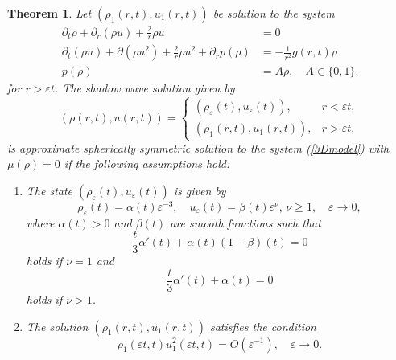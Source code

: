 \documentclass[reqno]{article}%
\theoremstyle{plain}
\newtheorem{theorem}{Theorem}[section]
\theoremstyle{definition}
\theoremstyle{remark}
\numberwithin{equation}{section}
\begin{document}
\begin{theorem}\label{thm:sdw0}
Let $(\rho_1(r,t),u_1(r,t))$ be  solution to the system
\begin{equation*}
\begin{split}
\partial_t \rho+\partial_r(\rho u)+\frac{2}{r}\rho u &=0\\
\partial_t(\rho u)+\partial(\rho u^2)+\frac{2}{r}\rho u^2+\partial_r p(\rho) &=-\frac{1}{r^2}g(r,t)\rho\\
p(\rho)&=A\rho,\quad A\in\{0,1\}.
\end{split}
\end{equation*}
for $r>\varepsilon t$. 
 The shadow wave solution given by 
\begin{equation*}
(\rho(r,t),u(r,t))=
\begin{cases}
(\rho_\varepsilon(t), u_\varepsilon(t)), & r<\varepsilon t,\\
(\rho_1(r,t),u_1(r,t)), & r>\varepsilon t,
\end{cases}\end{equation*}
is approximate  spherically symmetric solution to the system (\ref{3Dmodel}) with $\mu(\rho)=0$  if the following assumptions hold:
\begin{enumerate}
\item The state $(\rho_\varepsilon(t),u_\varepsilon(t))$ is given by  
\begin{equation*}
\rho_\varepsilon(t)=\alpha(t)\varepsilon^{-3},\quad u_\varepsilon(t)=\beta(t)\varepsilon^\nu,\,\nu\geq 1, \quad \varepsilon\to 0,
\end{equation*}
where $\alpha(t)>0$ and  $\beta(t)$ are smooth functions such that
\[\frac{t}{3}\alpha'(t)+\alpha(t)(1-\beta)(t)=0\]
holds if $\nu=1$ and 
\[\frac{t}{3}\alpha'(t)+\alpha(t)=0\] 
holds if $\nu>1$.
\item The solution $(\rho_1(r,t),u_1(r,t))$ satisfies the condition 
\begin{equation}\label{novisc_cd}
\rho_1(\varepsilon t,t)u_1^2(\varepsilon t,t)=O(\varepsilon^{-1}),\quad\varepsilon\to 0.
\end{equation} 
\end{enumerate}

\end{theorem}
\end{document}
